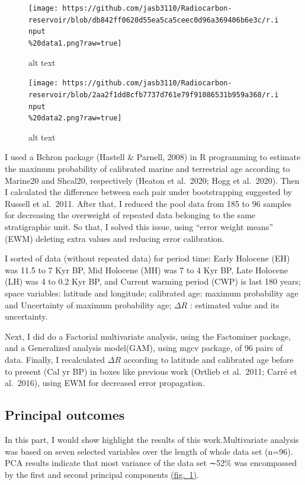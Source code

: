 \documentclass[
]{article}
\begin{document}
\begin{figure}
\centering
\texttt{[image: https://github.com/jasb3110/Radiocarbon-reservoir/blob/db842ff0620d55ea5ca5ceec0d96a369406b6e3c/r.input\\\%20data1.png?raw=true]}
\caption{alt text}
\end{figure}

\begin{figure}
\centering
\texttt{[image: https://github.com/jasb3110/Radiocarbon-reservoir/blob/2aa2f1dd8cfb7737d761e79f91086531b959a368/r.input\\\%20data2.png?raw=true]}
\caption{alt text}
\end{figure}

I used a Bchron package (Hastell \& Parnell, 2008) in R programming to
estimate the maximum probability of calibrated marine and terrestrial
age according to Marine20 and Shcal20, respectively (Heaton et al.~2020;
Hogg et al.~2020). Then I calculated the difference between each pair
under bootstrapping suggested by Russell et al.~2011. After that, I
reduced the pool data from 185 to 96 samples for decreasing the
overweight of repeated data belonging to the same stratigraphic unit. So
that, I solved this issue, using ``error weight means'' (EWM) deleting
extra values and reducing error calibration.

I sorted of data (without repeated data) for period time: Early Holocene
(EH) was 11.5 to 7 Kyr BP, Mid Holocene (MH) was 7 to 4 Kyr BP, Late
Holocene (LH) was 4 to 0.2 Kyr BP, and Current warming period (CWP) is
last 180 years; space variables: latitude and longitude; calibrated age:
maximum probability age and Uncertainty of maximum probability age;
\(\Delta R\) : estimated value and its uncertainty.

Next, I did do a Factorial multivariate analysis, using the Factominer
package, and a Generalized analysis model(GAM), using mgcv package, of
96 pairs of data. Finally, I recalculated \(\Delta R\) according to
latitude and calibrated age before to present (Cal yr BP) in boxes like
previous work (Ortlieb et al.~2011; Carré et al.~2016), using EWM for
decreased error propagation.

\hypertarget{principal-outcomes}{%
\subsection{Principal outcomes}\label{principal-outcomes}}

In this part, I would show highlight the results of this
work.Multivariate analysis was based on seven selected variables over
the length of whole data set (n=96). PCA results indicate that most
variance of the data set ∼52\% was encompassed by the first and second
principal components
\protect\hyperlink{principal-component-analysis-ux28pcaux29}{(fig.~1)}.
\end{document}
